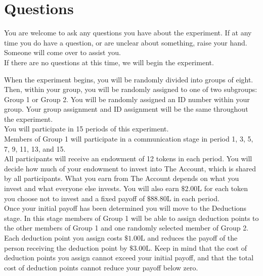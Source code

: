 \documentclass[12pt]{article}
\begin{document}
\section*{Questions}


You are welcome to ask any questions you have about the experiment.  If at any time you do have a question, or are unclear about something, raise your hand. Someone will come over to assist you.\\

If there are no questions at this time, we will begin the experiment.\\ 
\fi


When the experiment begins, you will be randomly divided into groups of eight. Then, within your group, you will be randomly assigned to one of two subgroups: Group 1 or Group 2. You will be randomly assigned an ID number within your group. Your group assignment and ID assignment will be the same throughout the experiment.\\

You will participate in 15 periods of this experiment.\\

Members of Group 1 will participate in a communication stage in period 1, 3, 5, 7, 9, 11, 13, and 15.\\

All participants will receive an endowment of 12 tokens in each period. You will decide how much of your endowment to invest into The Account, which is shared by all participants. What you earn from The Account depends on what you invest and what everyone else invests. You will also earn $\$2.00\text{L}$ for each 
token you choose not to invest and a fixed payoff of $\$88.80\text{L}$ in each period.\\

Once your initial payoff has been determined you will move to the Deductions stage. In this stage members of Group 1 will be able to assign deduction points to the other members of Group 1 and one randomly selected member of Group 2. Each deduction point you assign costs $\$1.00\text{L}$ and reduces the payoff of the person receiving the deduction point by $\$3.00\text{L}$. Keep in mind that the cost of deduction points you assign cannot exceed your initial payoff, and that the total cost of deduction points cannot reduce your payoff below zero.\\
\end{document}
